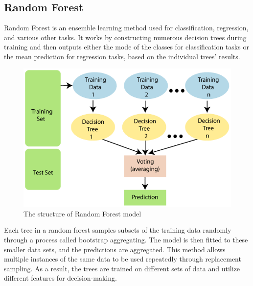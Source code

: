 \documentclass{ieeeojies}
\begin{document}
\subsection{Random Forest}
Random Forest \cite{b9} is an ensemble learning method used for classification, regression, and various other tasks. It works by constructing numerous decision trees during training and then outputs either the mode of the classes for classification tasks or the mean prediction for regression tasks, based on the individual trees' results.
\begin{figure}[H]
	\centering
	\begin{minipage}{0.23\textwidth}
		\centering
		\includegraphics[width=1\textwidth]{bibliography/Images/RandomForest_Img1.png}
		\caption{The structure of Random Forest model}
		\label{fig:1}
	\end{minipage}
\end{figure}
Each tree in a random forest samples subsets of the training data randomly through a process called bootstrap aggregating. The model is then fitted to these smaller data sets, and the predictions are aggregated. This method allows multiple instances of the same data to be used repeatedly through replacement sampling. As a result, the trees are trained on different sets of data and utilize different features for decision-making.
\end{document}
